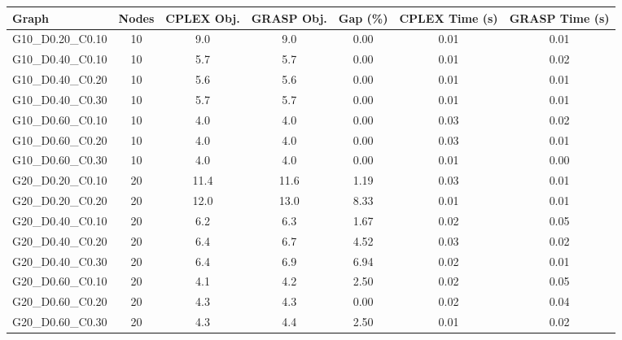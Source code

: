 \begin{tabular}{|l|c|c|c|c|c|c|}
\hline
\textbf{Graph} & \textbf{Nodes} & \textbf{CPLEX Obj.} & \textbf{GRASP Obj.} & \textbf{Gap (\%)} & \textbf{CPLEX Time (s)} & \textbf{GRASP Time (s)} \\
\hline
G10_D0.20_C0.10 & 
10 & 
9.0 & 
9.0 & 
0.00 & 
0.01 & 
0.01 \\
G10_D0.40_C0.10 & 
10 & 
5.7 & 
5.7 & 
0.00 & 
0.01 & 
0.02 \\
G10_D0.40_C0.20 & 
10 & 
5.6 & 
5.6 & 
0.00 & 
0.01 & 
0.01 \\
G10_D0.40_C0.30 & 
10 & 
5.7 & 
5.7 & 
0.00 & 
0.01 & 
0.01 \\
G10_D0.60_C0.10 & 
10 & 
4.0 & 
4.0 & 
0.00 & 
0.03 & 
0.02 \\
G10_D0.60_C0.20 & 
10 & 
4.0 & 
4.0 & 
0.00 & 
0.03 & 
0.01 \\
G10_D0.60_C0.30 & 
10 & 
4.0 & 
4.0 & 
0.00 & 
0.01 & 
0.00 \\
G20_D0.20_C0.10 & 
20 & 
11.4 & 
11.6 & 
1.19 & 
0.03 & 
0.01 \\
G20_D0.20_C0.20 & 
20 & 
12.0 & 
13.0 & 
8.33 & 
0.01 & 
0.01 \\
G20_D0.40_C0.10 & 
20 & 
6.2 & 
6.3 & 
1.67 & 
0.02 & 
0.05 \\
G20_D0.40_C0.20 & 
20 & 
6.4 & 
6.7 & 
4.52 & 
0.03 & 
0.02 \\
G20_D0.40_C0.30 & 
20 & 
6.4 & 
6.9 & 
6.94 & 
0.02 & 
0.01 \\
G20_D0.60_C0.10 & 
20 & 
4.1 & 
4.2 & 
2.50 & 
0.02 & 
0.05 \\
G20_D0.60_C0.20 & 
20 & 
4.3 & 
4.3 & 
0.00 & 
0.02 & 
0.04 \\
G20_D0.60_C0.30 & 
20 & 
4.3 & 
4.4 & 
2.50 & 
0.01 & 
0.02 \\
\hline
\end{tabular}
